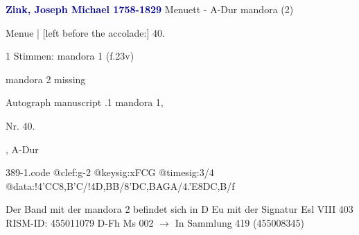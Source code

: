 \documentclass[twocolumn]{book}
\begin{document}
\newline \par \vspace{7pt} \textcolor{darkblue}{\textbf{Zink, Joseph Michael  1758-1829}}
\newline Menuett - A-Dur
\newline mandora (2)
\newline \begin{itshape}[f.23v, at left:] Menue | [left before the accolade:] 40.\end{itshape} 
\newline \textcolor{darkblue}{}  1 Stimmen: mandora 1  (f.23v)
\newline \begin{small} mandora 2 missing\end{small} 
\newline Autograph manuscript
.1  mandora 1, \begin{itshape}Nr. 40.\end{itshape}, A-Dur  
\begin{filecontents*}{389-1.code}
@clef:g-2
@keysig:xFCG
@timesig:3/4
@data:!4'CC{8,B'C}/!4D,BB/{8'DC},BA{GA}/4.'E{8DC,B}/f
\end{filecontents*}
\newline
%
\newline Der Band mit der mandora 2 befindet sich in D Eu mit der Signatur Esl VIII 403
\newline RISM-ID: 455011079
\newline D-Fh  Ms 002
\newline $\rightarrow$ In Sammlung 419 (455008345)
      
\end{document}
